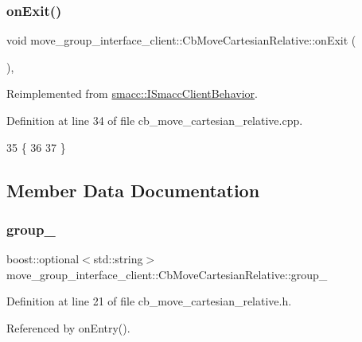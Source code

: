 \subsubsection{\texorpdfstring{on\+Exit()}{onExit()}}
{\footnotesize\ttfamily void move\+\_\+group\+\_\+interface\+\_\+client\+::\+Cb\+Move\+Cartesian\+Relative\+::on\+Exit (\begin{DoxyParamCaption}{ }\end{DoxyParamCaption})\hspace{0.3cm}{\ttfamily [override]}, {\ttfamily [virtual]}}



Reimplemented from \hyperlink{classsmacc_1_1ISmaccClientBehavior_a36bf771905e3bf750909a15e4215a9b3}{smacc\+::\+I\+Smacc\+Client\+Behavior}.



Definition at line 34 of file cb\+\_\+move\+\_\+cartesian\+\_\+relative.\+cpp.


\begin{DoxyCode}
35 \{
36     
37 \}
\end{DoxyCode}


\subsection{Member Data Documentation}
\mbox{\label{classmove__group__interface__client_1_1CbMoveCartesianRelative_a5da33d1b7d822c971f8e282e5ade7238}} 
\subsubsection{\texorpdfstring{group\+\_\+}{group\_}}
{\footnotesize\ttfamily boost\+::optional$<$std\+::string$>$ move\+\_\+group\+\_\+interface\+\_\+client\+::\+Cb\+Move\+Cartesian\+Relative\+::group\+\_\+}



Definition at line 21 of file cb\+\_\+move\+\_\+cartesian\+\_\+relative.\+h.



Referenced by on\+Entry().

